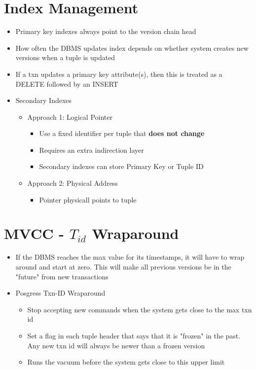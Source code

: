\documentclass[11pt]{article}
\begin{document}
\section{Index Management}
\begin{itemize}
    \item Primary key indexes always point to the version chain head
    \item How often the DBMS updates index depends on whether system creates new versions when a tuple is updated
    \item If a txn updates a primary key attribute(s), then this is treated as a DELETE followed by an INSERT
    \item Secondary Indexes
    \begin{itemize}
        \item Approach 1: Logical Pointer
        \begin{itemize}
            \item Use a fixed identifier per tuple that \textbf{does not change}
            \item Requires an extra indirection layer
            \item Secondary indexes can store Primary Key or Tuple ID
        \end{itemize}
        \item Approach 2: Physical Address
        \begin{itemize}
            \item Pointer physicall points to tuple
        \end{itemize}
    \end{itemize}
\end{itemize}


\section{MVCC - $T_{id}$ Wraparound}
\begin{itemize}
    \item If the DBMS reaches the max value for its timestamps, it will have to wrap around and start at zero. This will make all previous versions be in the "future" from new transactions
    \item Posgress Txn-ID Wraparound
    \begin{itemize}
        \item Stop accepting new commands when the system gets close to the max txn id
        \item Set a flag in each tuple header that says that it is "frozen" in the past. Any new txn id will always be newer than a frozen version
        \item Runs the vacuum before the system gets close to this upper limit
    \end{itemize}
\end{itemize}
\end{document}

